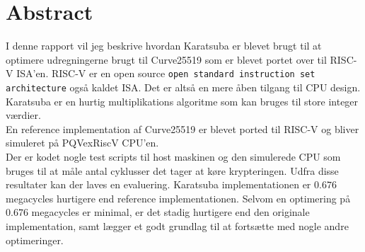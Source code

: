 \section{Abstract}
I denne rapport vil jeg beskrive hvordan Karatsuba er blevet brugt til at optimere udregningerne brugt til Curve25519 som er blevet portet over til RISC-V ISA'en. RISC-V er en open source \texttt{open standard instruction set architecture} også kaldet ISA. Det er altså en mere åben tilgang til CPU design.
\\
Karatsuba er en hurtig multiplikations algoritme som kan bruges til store integer værdier.\\En reference implementation af Curve25519 er blevet ported til RISC-V og bliver simuleret på PQVexRiscV CPU'en.\\Der er kodet nogle test scripts til host maskinen og den simulerede CPU som bruges til at måle antal cyklusser det tager at køre krypteringen.  
Udfra disse resultater kan der laves en evaluering. Karatsuba implementationen er $0.676$ megacycles hurtigere end reference implementationen. Selvom en optimering på $0.676$ megacycles er minimal, er det stadig hurtigere end den originale implementation, samt lægger et godt grundlag til at fortsætte med nogle andre optimeringer.
\pagebreak